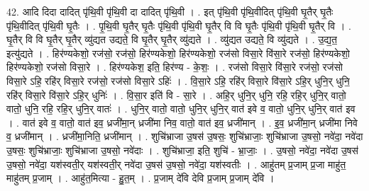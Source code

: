 \documentclass[17pt]{extarticle}
\begin{document}
42. आदि दिदा दादित् पृ॑थि॒वी पृ॑थि॒वी दा दादित् पृ॑थि॒वी । . इत् पृ॑थि॒वी पृ॑थि॒वीदित् पृ॑थि॒वी घृ॒तैर् घृ॒तैः पृ॑थि॒वीदित् पृ॑थि॒वी घृ॒तैः । . पृ॒थि॒वी घृ॒तैर् घृ॒तैः पृ॑थि॒वी पृ॑थि॒वी घृ॒तैर् वि वि घृ॒तैः पृ॑थि॒वी पृ॑थि॒वी घृ॒तैर् वि । . घृ॒तैर् वि वि घृ॒तैर् घृ॒तैर् व्यु॑द्यत उद्यते॒ वि घृ॒तैर् घृ॒तैर् व्यु॑द्यते । . व्यु॑द्यत उद्यते॒ वि व्यु॑द्यते । . उ॒द्य॒त॒ इत्यु॑द्यते । . हिर॑ण्यकेशो॒ रज॑सो॒ रज॑सो॒ हिर॑ण्यकेशो॒ हिर॑ण्यकेशो॒ रज॑सो विसा॒रे वि॑सा॒रे रज॑सो॒ हिर॑ण्यकेशो॒ हिर॑ण्यकेशो॒ रज॑सो विसा॒रे । . हिर॑ण्यकेश॒ इति॒ हिर॑ण्य - के॒शः॒ । . रज॑सो विसा॒रे वि॑सा॒रे रज॑सो॒ रज॑सो विसा॒रे ऽहि॒ रहि॑र् विसा॒रे रज॑सो॒ रज॑सो विसा॒रे ऽहिः॑ । . वि॒सा॒रे ऽहि॒ रहि॑र् विसा॒रे वि॑सा॒रे ऽहि॒र् धुनि॒र् धुनि॒ रहि॑र् विसा॒रे वि॑सा॒रे ऽहि॒र् धुनिः॑ । . वि॒सा॒र इति॑ वि - सा॒रे । . अहि॒र् धुनि॒र् धुनि॒ रहि॒ रहि॒र् धुनि॒र् वातो॒ वातो॒ धुनि॒ रहि॒ रहि॒र् धुनि॒र् वातः॑ । . धुनि॒र् वातो॒ वातो॒ धुनि॒र् धुनि॒र् वात॑ इवे व॒ वातो॒ धुनि॒र् धुनि॒र् वात॑ इव । . वात॑ इवे व॒ वातो॒ वात॑ इव॒ ध्रजी॑मा॒न् ध्रजी॑मा निव॒ वातो॒ वात॑ इव॒ ध्रजी॑मान् । . इ॒व॒ ध्रजी॑मा॒न् ध्रजी॑मा निवे व॒ ध्रजी॑मान् । . ध्रजी॑मा॒निति॒ ध्रजी॑मान् । . शुचि॑भ्राजा उ॒षस॑ उ॒षसः॒ शुचि॑भ्राजाः॒ शुचि॑भ्राजा उ॒षसो॒ नवे॑दा॒ नवे॑दा उ॒षसः॒ शुचि॑भ्राजाः॒ शुचि॑भ्राजा उ॒षसो॒ नवे॑दाः । . शुचि॑भ्राजा॒ इति॒ शुचि॑ - भ्रा॒जाः॒ । . उ॒षसो॒ नवे॑दा॒ नवे॑दा उ॒षस॑ उ॒षसो॒ नवे॑दा॒ यश॑स्वती॒र् यश॑स्वती॒र् नवे॑दा उ॒षस॑ उ॒षसो॒ नवे॑दा॒ यश॑स्वतीः । . आहु॑तम् प्र॒जाम् प्र॒जा माहु॑त॒ माहु॑तम् प्र॒जाम् । . आहु॑त॒मित्या - हु॒त॒म् । . प्र॒जाम् दे॑वि देवि प्र॒जाम् प्र॒जाम् दे॑वि । \newline
\end{document}
